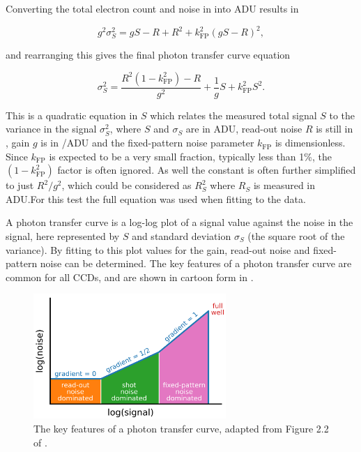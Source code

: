 \begin{colsection}
\begin{colsection}
Converting the total electron count and noise in  into ADU results in

\begin{equation}
    g^2\sigma_S^2 = gS - R + R^2 + k_\text{FP}^2 {(gS - R)}^2,
    \label{eq:ptc_noise2}
\end{equation}

and rearranging this gives the final photon transfer curve equation

\begin{equation}
    \sigma_S^2 = \frac{R^2(1-k_\text{FP}^2) - R}{g^2} + \frac{1}{g}S + k_\text{FP}^2 S^2.
    \label{eq:ptc}
\end{equation}

This is a quadratic equation in $S$ which relates the measured total signal $S$ to the variance in the signal $\sigma_S^2$, where $S$ and $\sigma_S$ are in ADU, read-out noise $R$ is still in \elec, gain $g$ is in \elec/ADU and the fixed-pattern noise parameter $k_\text{FP}$ is dimensionless. Since $k_\text{FP}$ is expected to be a very small fraction, typically less than 1\%, the $(1-k_\text{FP}^2)$ factor is often ignored. As well the constant is often further simplified to just $R^2/g^2$, which could be considered as $R_S^2$ where $R_S$ is measured in ADU.\@ For this test the full equation was used when fitting to the data.

A photon transfer curve is a log-log plot of a signal value against the noise in the signal, here represented by $S$ and standard deviation $\sigma_S$ (the square root of the variance). By fitting  to this plot values for the gain, read-out noise and fixed-pattern noise can be determined. The key features of a photon transfer curve are common for all CCDs, and are shown in cartoon form in .

\newpage

\begin{figure}[t]
    \begin{center}
        \includegraphics[width=0.65\textwidth]{images/ptc.pdf}
    \end{center}
    \caption[Key features of the photon transfer curve]{
        The key features of a photon transfer curve, adapted from Figure 2.2 of \citet{CCDs}.
    }\label{fig:ptc_cartoon}
\end{figure}


\end{colsection}
\end{colsection}
